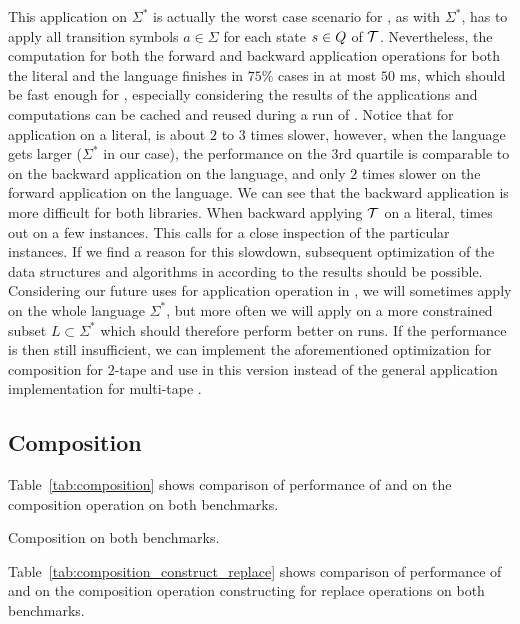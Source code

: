 This application on $\Sigma^*$ is actually the worst case scenario for \mata, as with $\Sigma^*$, \mata has to apply all transition symbols $a \in \Sigma$ for each state $s \in Q$ of $\mathcal{T}$.
Nevertheless, the computation for both the forward and backward application operations for both the literal and the language finishes in $75\%$ cases in at most $50$ ms, which should be fast enough for \noodler, especially considering the results of the applications and computations can be cached and reused during a run of \noodler.
Notice that for application on a literal, \mata is about $2$ to $3$ times slower, however, when the language gets larger ($\Sigma^*$ in our case), the performance on the 3rd quartile is comparable to \mona on the backward application on the language, and only $2$ times slower on the forward application on the language.
We can see that the backward application is more difficult for both libraries.
When backward applying $\mathcal{T}$ on a literal, \mata times out on a few instances.
This calls for a close inspection of the particular instances.
If we find a reason for this slowdown, subsequent optimization of the data structures and algorithms in \mata according to the results should be possible.
Considering our future uses for application operation in \noodler, we will sometimes apply on the whole language $\Sigma^*$, but more often we will apply on a more constrained subset $L \subset \Sigma^*$ which should therefore perform better on \noodler runs.
If the performance is then still insufficient, we can implement the aforementioned optimization for composition for $2$-tape \nfts and use in \noodler this version instead of the general application implementation for multi-tape \nfts.

\subsection{Composition}

Table~\ref{tab:composition} shows comparison of performance of \mata and \mona on the composition operation on both benchmarks.

\begin{table}[ht]
  \centering
  
  \caption{
    Composition on both benchmarks.
  }
  \label{tab:composition}
\end{table}

Table~\ref{tab:composition_construct_replace} shows comparison of performance of \mata and \mona on the composition operation constructing \nfts for replace operations on both benchmarks.

